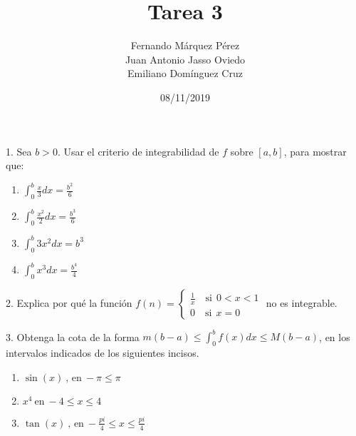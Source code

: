 \documentclass[12pt]{article}
\title{Tarea 3}
\author{Fernando Márquez Pérez \\ Juan Antonio Jasso Oviedo \\ Emiliano Dom\'inguez Cruz}
\date{08/11/2019}
\affil{Facultad de Ciencias\\UNAM}
\begin{document}
\begin{titlepage}
    \maketitle
\end{titlepage}

1. Sea $b>0$. Usar el criterio de integrabilidad de $f$ sobre $[a,b]$, para mostrar que:

\begin{enumerate}[\hspace{9px} a)]
    \item \(\displaystyle\int_{0}^{b}\frac{x}{3}dx=\frac{b^2}{6}\)
    
    \item \(\displaystyle\int_{0}^{b}\frac{x^2}{2}dx=\frac{b^3}{6}\)
    
    \item \(\displaystyle\int_{0}^{b}3x^2dx=b^3\)
    
    \item \(\displaystyle\int_{0}^{b}x^3dx=\frac{b^4}{4}\)
    
\end{enumerate}

2. Explica por qu\'e la funci\'on 
\(f(n)=
\begin{cases}
    \frac{1}{x} \quad \text{si} \ \ 0<x<1\\
    0 \quad \text{si} \ \ x=0
\end{cases}
\) no es integrable.

3. Obtenga la cota de la forma \(m(b-a) \leq \displaystyle\int_{0}^{b}f(x)dx \leq M(b-a)\), en los intervalos indicados de los siguientes incisos.

\begin{enumerate}[\hspace{9px} a)]
    \item \(\sin(x) \ \text{, en} \ -\pi \leq \pi\)
    
    \item \(x^4 \ \text{en} \ -4 \leq x \leq 4\)
    
    \item \(\tan(x) \ \text{, en} \ -\frac{pi}{4} \leq x \leq \frac{pi}{4}\)
    
\end{enumerate}
\end{document}
